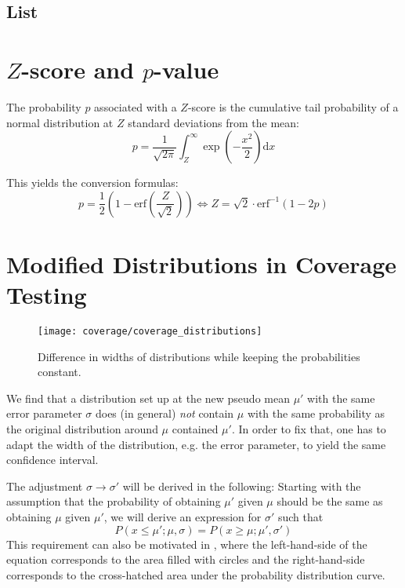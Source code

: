 \pagebreak
\subsection{List}
{
    \small
    \def\arraystretch{1}
    
}

\newpage
\section{$Z$-score and $p$-value}
\label{app:z_score}

The probability $p$ associated with a $Z$-score is the cumulative tail probability of a normal distribution at $Z$ standard deviations from the mean:
\begin{equation}
    p = \frac{1}{\sqrt{2 \pi}}\int_Z^{\infty} \exp\left(-\frac{x^2}{2}\right) \text{d}x
\end{equation}

This yields the conversion formulas:
\begin{equation}
    p = \frac{1}{2} \left(1 - \text{erf}\left(\frac{Z}{\sqrt{2}}\right) \right) \Leftrightarrow Z = \sqrt{2} \cdot \text{erf}^{-1} \left( 1 - 2 p \right) 
\end{equation}

\newpage
\section{Modified Distributions in Coverage Testing}
\label{app:coverage_uncertainty}


\begin{figure}
    \centering
    \texttt{[image: coverage/coverage\_distributions]}
    \caption{Difference in widths of distributions while keeping the probabilities constant.}
    \label{fig:coverage_distributions}
\end{figure}


We find that a distribution set up at the new pseudo mean $\mu'$ with the same error parameter $\sigma$ does (in general) \emph{not} contain $\mu$ with the same probability as the original distribution around $\mu$ contained $\mu'$.
In order to fix that, one has to adapt the width of the distribution, e.g. the error parameter, to yield the same confidence interval.

The adjustment $\sigma \rightarrow \sigma'$ will be derived in the following:
Starting with the assumption that the probability of obtaining $\mu'$ given $\mu$ should be the same as obtaining $\mu$ given $\mu'$, we will derive an expression for $\sigma'$ such that
\begin{equation}
    P(x \leq \mu'; \mu, \sigma) = P(x \geq \mu; \mu', \sigma')
\end{equation}
This requirement can also be motivated in , where the left-hand-side of the equation corresponds to the area filled with circles and the right-hand-side corresponds to the cross-hatched area under the probability distribution curve.

